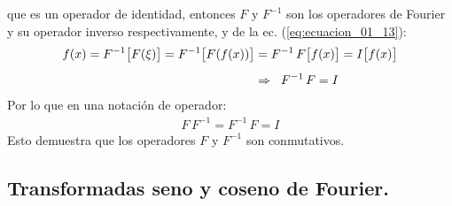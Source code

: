 que es un operador de identidad, entonces $F$ y $F^{-1}$ son los operadores de Fourier y su operador inverso respectivamente, y de la ec. (\ref{eq:ecuacion_01_13}):
\begin{align}
\begin{aligned}[b]
f (x) = F^{-1} \big[ F (\xi) \big] = F^{-1} \big[ F(f (x)) \big] &= F^{-1} \, F \big[ f (x) \big] = I \big[ f (x) \big] \\[0.5em]
&\Rightarrow \hspace{0.2cm} F^{-1} \, F = I
\end{aligned}
\label{eq:ecuacion_01_16}
\end{align}
Por lo que en una notación de operador:
\begin{align*}
F \, F^{-1} = F^{-1} \, F = I
\end{align*}
Esto demuestra que los operadores $F$ y $F^{-1}$ son conmutativos.

\subsection{Transformadas seno y coseno de Fourier.}

